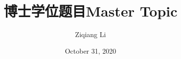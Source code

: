 
\subject{Computer science and Technology}
\author{Ziqiang Li}

\date{October 31, 2020}

\ifxueweidoctor
  \title{博士学位题目} %
\fi
\ifxueweimaster
  \title{Master Topic}
\fi

\makecover
\clearpage
\setcounter{page}{1}
